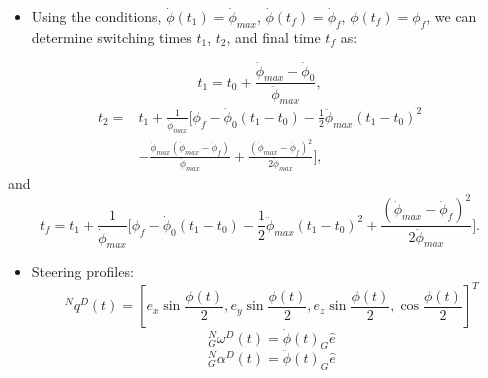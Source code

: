 \documentclass[letterpaper, preprint, paper,11pt]{AAS}	%
\begin{document}
			
			\begin{itemize}
				\item Using the conditions, $\dot{\phi}(t_1)=\dot{\phi}_{max}$, $\dot{\phi}(t_f)=\dot{\phi}_f$, $\phi(t_f)=\phi_f$, we can determine switching times $t_1$, $t_2$, and final time $t_f$ as:
			\end{itemize}
			\begin{equation}\label{t1cons}
				t_1=t_0+\frac{\dot{\phi}_{max}-\dot{\phi}_0}{\ddot{\phi}_{max}},
			\end{equation}
			\begin{equation}\label{t2cons}
				\begin{split}
				t_2=&t_1+\frac{1}{\dot{\phi}_{max}}\Big[ \phi_f-\dot{\phi}_0(t_1-t_0)-\frac{1}{2}\ddot{\phi}_{max}(t_1-t_0)^2\\
				&-\frac{\dot{\phi}_{max}(\dot{\phi}_{max}-\dot{\phi}_f)}{\ddot{\phi}_{max}}+\frac{(\dot{\phi}_{max}-\dot{\phi}_f)^2}{2\ddot{\phi}_{max}} \Big],
				\end{split}
			\end{equation}
			and
			\begin{equation}\label{tfcons}
				t_f=t_1+\frac{1}{\dot{\phi}_{max}}\Big[ \phi_f-\dot{\phi}_0(t_1-t_0)-\frac{1}{2}\ddot{\phi}_{max}(t_1-t_0)^2+\frac{(\dot{\phi}_{max}-\dot{\phi}_f)^2}{2\ddot{\phi}_{max}} \Big].
			\end{equation}
			
	
			\begin{itemize}
				\item Steering profiles:
				\begin{equation}
				^Nq^D(t)=[e_x\sin\frac{\phi(t)}{2}, e_y\sin\frac{\phi(t)}{2}, e_z\sin\frac{\phi(t)}{2}, \cos\frac{\phi(t)}{2}]^T
				\end{equation}
				\begin{equation}
				^N_G\omega^D(t)=\dot{\phi}(t)_G\hat{e}
				\end{equation}
				\begin{equation}
				^N_G\alpha^D(t)=\ddot{\phi}(t)_G\hat{e}
				\end{equation}
			\end{itemize}
		
\end{document}

